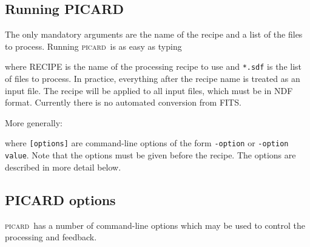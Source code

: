 \documentclass[twoside,11pt,nolof]{starlink}
\providecommand{\picard}{\textsc{picard}}
\providecommand{\task}[1]{\textsf{#1}}
\begin{document}
\subsection{Running PICARD}

The only mandatory arguments are the name of the recipe and a list of
the files to process. Running \picard\ is as easy as typing
\begin{terminalv}
\end{terminalv}
where \task{RECIPE} is the name of the processing recipe to use and
\verb+*.sdf+ is the list of files to process. In practice, everything
after the recipe name is treated as an input file. The recipe will be
applied to all input files, which must be in NDF format. Currently
there is no automated conversion from FITS.

More generally:
\begin{terminalv}
\end{terminalv}
where \verb+[options]+ are command-line options of the form
\verb+-option+ or \verb+-option value+.  Note that the options must be
given before the recipe. The options are described in more detail
below.

\subsection{PICARD options}

\picard\ has a number of command-line options which may be used to
control the processing and feedback.
\end{document}
